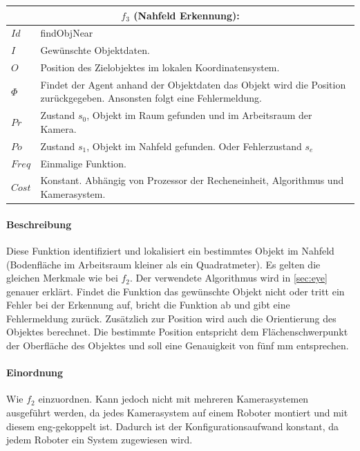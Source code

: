 \begin{tabular}{|p{3cm}|p{10cm}|}
	\multicolumn{2}{c}{$f_3$ (Nahfeld Erkennung):}\\
	\hline  $Id$ & findObjNear\\ 
	\hline  $I$ & Gewünschte Objektdaten. \\ 
	\hline  $O$ & Position des Zielobjektes im lokalen Koordinatensystem. \\ 
	\hline  $\Phi$ & Findet der Agent anhand der Objektdaten das Objekt wird die Position zurückgegeben. Ansonsten folgt eine Fehlermeldung.\\ 
	\hline $Pr$ & Zustand $s_0$, Objekt im Raum gefunden und im Arbeitsraum der Kamera. \\ 
	\hline $Po$ & Zustand $s_1$, Objekt im Nahfeld gefunden. Oder Fehlerzustand $s_e$\\ 
	\hline $Freq$ & Einmalige Funktion.\\ 
	\hline $Cost$ & Konstant. Abhängig von Prozessor der Recheneinheit, Algorithmus und Kamerasystem. \\
	\hline
\end{tabular} 

\paragraph{Beschreibung}
Diese Funktion identifiziert und lokalisiert ein bestimmtes Objekt im Nahfeld (Bodenfläche im Arbeitsraum kleiner als ein Quadratmeter). Es gelten die gleichen Merkmale wie bei $f_2$. Der verwendete Algorithmus wird in \ref{sec:eye} genauer erklärt. Findet die Funktion das gewünschte Objekt nicht oder tritt ein Fehler bei der Erkennung auf, bricht die Funktion ab und gibt eine Fehlermeldung zurück. Zusätzlich zur Position wird auch die Orientierung des Objektes berechnet. Die bestimmte Position entspricht dem Flächenschwerpunkt der Oberfläche des Objektes und soll eine Genauigkeit von fünf mm entsprechen.

\paragraph{Einordnung}
Wie $f_2$ einzuordnen. Kann jedoch nicht mit mehreren Kamerasystemen ausgeführt werden, da jedes Kamerasystem auf einem Roboter montiert und mit diesem eng-gekoppelt ist. Dadurch ist der Konfigurationsaufwand konstant, da jedem Roboter ein System zugewiesen wird. 


